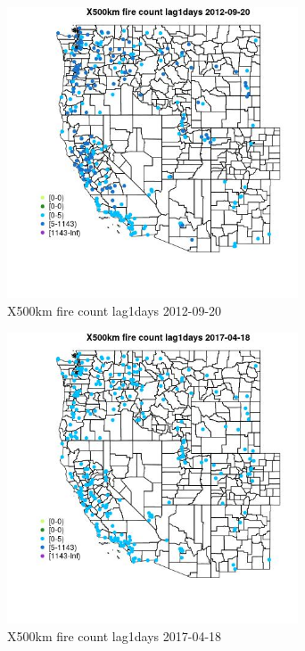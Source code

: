 \begin{figure} 
\centering  
\includegraphics[width=0.77\textwidth]{Code_Outputs/Report_ML_input_PM25_Step4_part_e_de_duplicated_aves_compiled_2019-05-14wNAs_MapObsX500km_fire_count_lag1days2012-09-20.jpg} 
\caption{\label{fig:Report_ML_input_PM25_Step4_part_e_de_duplicated_aves_compiled_2019-05-14wNAsMapObsX500km_fire_count_lag1days2012-09-20}X500km fire count lag1days 2012-09-20} 
\end{figure} 
 

\begin{figure} 
\centering  
\includegraphics[width=0.77\textwidth]{Code_Outputs/Report_ML_input_PM25_Step4_part_e_de_duplicated_aves_compiled_2019-05-14wNAs_MapObsX500km_fire_count_lag1days2017-04-18.jpg} 
\caption{\label{fig:Report_ML_input_PM25_Step4_part_e_de_duplicated_aves_compiled_2019-05-14wNAsMapObsX500km_fire_count_lag1days2017-04-18}X500km fire count lag1days 2017-04-18} 
\end{figure} 
 

